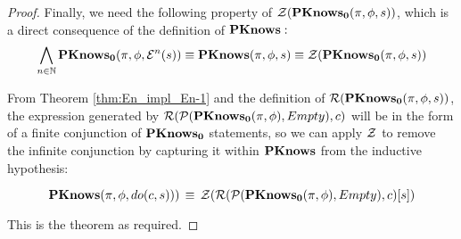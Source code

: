 \begin{proof}
Finally, we need the following property of $\mathcal{Z}(\mathbf{PKnows_{0}}(\pi,\phi,s))$,
which is a direct consequence of the definition of $\mathbf{PKnows}:$\[
\bigwedge_{n\in\mathbb{N}}\mathbf{PKnows_{0}}(\pi,\phi,\mathcal{E}^{n}(s))\equiv\mathbf{PKnows}(\pi,\phi,s)\equiv\mathcal{Z}(\mathbf{PKnows_{0}}(\pi,\phi,s))\]


From Theorem \ref{thm:En_impl_En-1} and the definition of $\mathcal{R}(\mathbf{PKnows_{0}}(\pi,\phi,s))$,
the expression generated by $\mathcal{R}(\mathcal{P}(\mathbf{PKnows_{0}}(\pi,\phi),Empty),c)$
will be in the form of a finite conjunction of $\mathbf{PKnows_{0}}$ statements,
so we can apply $\mathcal{Z}$ to remove the infinite conjunction by capturing
it within $\mathbf{PKnows}$ from the inductive hypothesis:

\[
\mathbf{PKnows}(\pi,\phi,do(c,s)))\,\equiv\,\mathcal{Z}(\mathcal{R}(\mathcal{P}(\mathbf{PKnows_{0}}(\pi,\phi),Empty),c)[s])\]


This is the theorem as required. 
\end{proof}
\medskip{}


